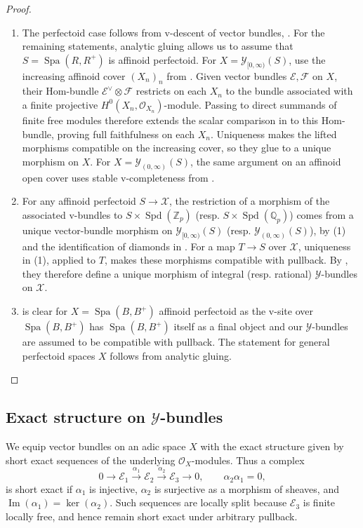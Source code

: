 \documentclass[10pt,twoside]{article}
\numberwithin{equation}{section}
\theoremstyle{plain}
\theoremstyle{definition}
\DeclareMathOperator{\im}{Im}
\DeclareMathOperator{\Spa}{Spa}
\DeclareMathOperator{\Spd}{Spd}
\newcommand{\ZZ}{\mathbb{Z}}
\newcommand{\QQ}{\mathbb{Q}}
\newcommand{\MCE}{\mathcal{E}}
\newcommand{\MCF}{\mathcal{F}}
\newcommand{\MCO}{\mathcal{O}}
\newcommand{\MCX}{\mathcal{X}}
\newcommand{\MCY}{\mathcal{Y}}
\newcommand{\Yco}{\MCY_{[0,\infty)}}
\newcommand{\Yoo}{\MCY_{(0,\infty)}}
\begin{document}
\begin{proof}
\begin{enumerate}
	\item[(1)] The perfectoid case follows from v-descent of vector bundles, \cite[Lemma 17.1.8]{SW20}. For the remaining statements, analytic gluing allows us to assume that \(S=\Spa(R,R^+)\) is affinoid perfectoid. For \(X=\Yco(S)\), use the increasing affinoid cover \((X_n)_n\) from . Given vector bundles \(\MCE,\MCF\) on \(X\), their Hom-bundle \(\MCE^\vee\otimes\MCF\) restricts on each \(X_n\) to the bundle associated with a finite projective \(H^0(X_n,\MCO_{X_n})\)-module. Passing to direct summands of finite free modules therefore extends the scalar comparison in  to this Hom-bundle, proving full faithfulness on each \(X_n\). Uniqueness makes the lifted morphisms compatible on the increasing cover, so they glue to a unique morphism on \(X\). For \(X=\Yoo(S)\), the same argument on an affinoid open cover uses stable v-completeness from \cite[Proposition 9.9]{KimIgusa}.

\item[(2)] For any affinoid perfectoid \(S\to\MCX\), the restriction
    of a morphism of the associated v-bundles to
    \(S\times\Spd(\ZZ_p)\) (resp. \(S\times\Spd(\QQ_p)\)) comes from
    a unique vector-bundle morphism on \(\Yco(S)\) (resp. \(\Yoo(S)\)),
    by (1) and the identification of diamonds in
    \cite[Proposition II.1.2]{FS21}. For a map \(T\to S\) over \(\MCX\),
    uniqueness in (1), applied to \(T\), makes these morphisms compatible
    with pullback. By , they therefore define a unique
    morphism of integral (resp. rational) \(\MCY\)-bundles on \(\MCX\).

    \item[(3)] is clear for \(X=\Spa(B,B^+)\) affinoid perfectoid as the v-site over \(\Spa(B,B^+)\) has \(\Spa(B,B^+)\) itself as a final object and our \(\MCY\)-bundles are assumed to be compatible with pullback. The statement for general perfectoid spaces \(X\) follows from analytic gluing.
\end{enumerate}
\end{proof}
\subsection{\texorpdfstring{Exact structure on \(\MCY\)-bundles}{Exact structure on Y-bundles}}
We equip vector bundles on an adic space \(X\) with the exact structure given by short exact sequences of the underlying \(\MCO_X\)-modules. Thus a complex
\[0\longrightarrow\MCE_1\xrightarrow{\alpha_1}\MCE_2\xrightarrow{\alpha_2}\MCE_3\longrightarrow0,\qquad \alpha_2\alpha_1=0,\]
is short exact if \(\alpha_1\) is injective, \(\alpha_2\) is surjective as a morphism of sheaves, and \(\im(\alpha_1)=\ker(\alpha_2)\). Such sequences are locally split because \(\MCE_3\) is finite locally free, and hence remain short exact under arbitrary pullback.
\end{document}
